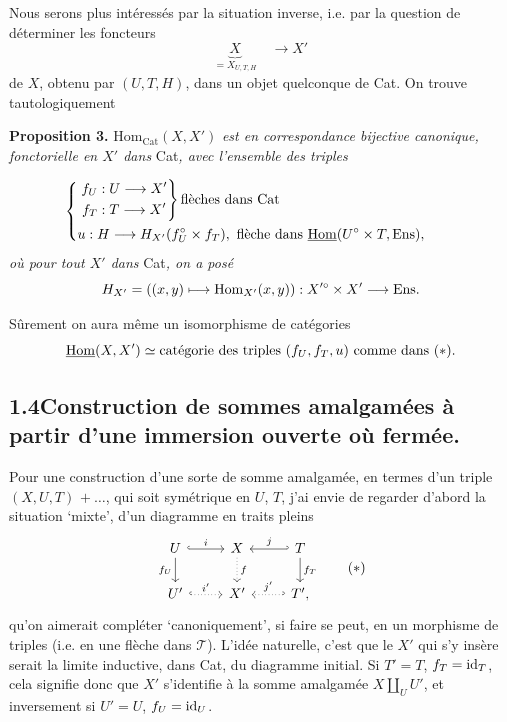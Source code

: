 
Nous serons plus intéressés par la situation inverse, i.e. par la question de déterminer les foncteurs
\[
\underbrace{X}_{= X_{U,T,H}} \quad \longrightarrow X'
\]
de $X$, obtenu par $(U,T,H)$, dans un objet quelconque de Cat. On trouve tautologiquement

\textbf{Proposition 3.} $\mathrm{Hom}_{\mathrm{Cat}}(X,X')$ \textit{est en correspondance bijective canonique, fonctorielle en $X'$ dans} Cat\textit{, avec l'ensemble des triples}


\[
\left\{
\begin{aligned}
&\left.\begin{aligned} f_U &: U \longrightarrow X' \\ f_T &: T \longrightarrow X' \end{aligned}\right\}\text{flèches dans Cat}\\
&u : H \longrightarrow H_{X'}(f_U^{\circ}\times f_T),\ \text{flèche dans } \uHom(U^{\circ}\times T,\Ens),
\end{aligned}
\right.
\tag*{}
\]
\textit{où pour tout $X'$ dans} Cat\textit{, on a posé}
\[
H_{X'} = ((x,y)\longmapsto \mathrm{Hom}_{X'}(x,y)) : X'^{\circ}\times X' \longrightarrow \mathrm{Ens}.
\]

Sûrement on aura même un isomorphisme de catégories
\[
\underline{\mathrm{Hom}}(X,X') \simeq \text{catégorie des triples } (f_U,f_T,u) \text{ comme dans } (*).
\]

\subsection*{1.4\quad Construction de sommes amalgamées à partir d'une immersion ouverte où fermée.} %

Pour une construction d'une sorte de somme amalgamée, en termes d'un triple $(X,U,T)$ $+\ \ldots$,  qui soit symétrique en $U$, $T$, j'ai envie de regarder d'abord la situation ‘mixte’, d'un diagramme en traits pleins
\[
\begin{tikzcd}
U \arrow[r, hook, "i"] \arrow[d, "f_U"'] & X \arrow[d, dotted, "f"] & T \arrow[l, hook', "j"'] \arrow[d, "f_T"] \\
U' \arrow[r, hook, dotted, "i'"] & X' & T', \arrow[l, hook', dotted, "j'"']
\end{tikzcd}
\tag*{$(*)$}
\]
qu'on aimerait compléter ‘canoniquement’, si faire se peut, en un morphisme de triples (i.e. en une flèche dans $\mathcal{T}$). L'idée naturelle, c'est que le $X'$ qui s'y insère serait la limite inductive, dans Cat, du diagramme initial. Si $T'=T$, $f_T=\mathrm{id}_T$, cela signifie donc que $X'$ s'identifie à la somme amalgamée $X\amalg_U U'$, et inversement si $U'=U$, $f_U=\mathrm{id}_U$.

